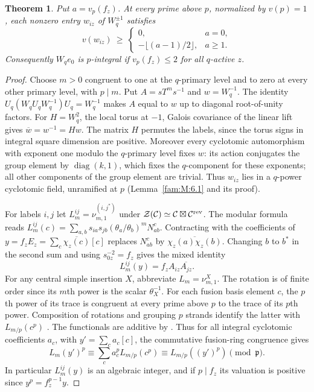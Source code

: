\documentclass[11pt,a4paper]{article}
\numberwithin{equation}{section}
\newtheorem{theorem}{Theorem}[section]
\theoremstyle{remark}
\begin{document}
\begin{theorem}\label{fam:W:2.1}\label{fam:W:n:thm:foreign-column}
Put $a=v_p(f_z)$. At every prime above $p$, normalized by $v(p)=1$,
each nonzero entry $w_{iz}$ of $W_q^{\pm1}$ satisfies
\[
 v(w_{iz})\ \ge\ \begin{cases}
  0,&a=0,\\
  -\lfloor(a-1)/2\rfloor,&a\ge1 .
 \end{cases}
\]
Consequently $W_qe_0$ is $p$-integral if $v_p(f_z)\le2$ for all
$q$-active $z$.
\end{theorem}

\begin{proof}
Choose $m>0$ congruent to one at the $q$-primary level and to zero
at every other primary level, with $p\mid m$. Put $A=sT^m s^{-1}$
and $w=W_q^{-1}$. The identity
$U_q(W_qU_q W_q^{-1})U_q=W_q^{-1}$ makes $A$ equal to $w$ up to
diagonal root-of-unity factors. For
$H=W_q^2$, the local torus at $-1$, Galois covariance of the
linear lift gives $\overline w=w^{-1}=Hw$. The matrix $H$ permutes
the labels, since the torus signs in integral square dimension are
positive. Moreover every cyclotomic automorphism with exponent one
modulo the $q$-primary level fixes $w$: its action conjugates the
group element by $\operatorname{diag}(k,1)$, which fixes the $q$-component for these exponents; all
other components of the group element are trivial. Thus $w_{iz}$ lies in a $q$-power cyclotomic
field, unramified at $p$ (Lemma~\ref{fam:M:6.1} and its proof).

For labels $i,j$ let $L_m^{ij}=\nu_{m,1}^{(i,j^*)}$ under
$\mathcal Z(\mathcal C)\simeq\mathcal C\boxtimes\mathcal C^{\rm rev}$.
The modular formula \cite[Proposition~6.1]{NSind} reads
$L_m^{ij}(c)=\sum_{a,b}s_{ia}s_{jb}
(\theta_a/\theta_b)^m N_{ab}^c$. Contracting with the coefficients of
$y=f_z E_z=\sum_c\overline{\chi_z(c)}[c]$ replaces $N_{ab}^c$
by $\overline{\chi_z(a)\chi_z(b)}$. Changing $b$ to $b^*$ in the
second sum and using $s_{0z}^{-2}=f_z$ gives the mixed identity
\[
                    L_m^{ij}(y)=f_z A_{iz}\overline{A_{jz}} .
\]
For any central simple insertion $X$, abbreviate $L_m=\nu_{m,1}^X$.
The rotation is of finite order since its $m$th power is the scalar
$\theta_X^{-1}$. For each fusion basis element $c$, the $p$th power
of its trace is congruent at every prime above $p$ to the trace
of its $p$th power. Composition of rotations and grouping $p$
strands identify the latter with $L_{m/p}(c^p)$
\cite[Lemmas~2.5, 2.7 and Proposition~2.8(ii),(iii)]{NSind}. The functionals
are additive by \cite[Corollary~5.5]{NSind}. Thus for all integral
cyclotomic coefficients $a_c$, with $y'=\sum_c a_c[c]$, the
commutative fusion-ring congruence gives
\[
 L_m(y')^p\equiv\sum_c a_c^p L_{m/p}(c^p)
                 \equiv L_{m/p}((y')^p)\pmod{\mathfrak p}.
\]
In particular $L_m^{ij}(y)$ is an algebraic integer, and if $p\mid f_z$
its valuation is positive since $y^p=f_z^{p-1}y$.


\end{proof}
\end{document}
